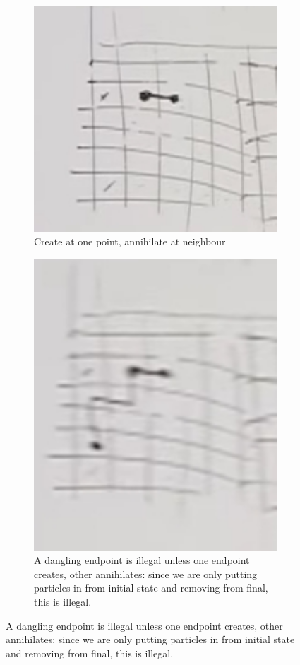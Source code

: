 \documentclass[]{article}
\begin{document}
\begin{figure}[H]
	\caption{Rules for Path Integrals}
	\begin{subfigure}{0.45\textwidth}
		\caption{Create at one point, annihilate at neighbour}\label{fig:path-integral5}
		\includegraphics[width=1.0\textwidth]{path-integral5}
	\end{subfigure}
	\begin{subfigure}{0.45\textwidth}
		\caption{A dangling endpoint is illegal unless one endpoint creates, other annihilates: since we are only putting particles in from initial state and removing from final, this is illegal.}\label{fig:path-integral4}
		\includegraphics[width=1.0\textwidth]{path-integral4}

\end{subfigure}
\end{figure}
\end{document}
